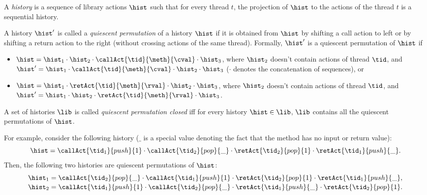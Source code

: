 A \emph{history} is a sequence of library actions $\hist$ such that %
for every thread $t$, the projection of $\hist$ to the actions of the thread $t$ is a sequential history.

A history $\hist'$ is called a \emph{quiescent permutation} of a history $\hist$ if it is obtained from $\hist$ by shifting a call action to left or by shifting a return action to the right (without crossing actions of the same thread).
Formally, $\hist'$ is a quiescent permutation of $\hist$ if 
\begin{itemize}
	\item %
	$\hist=\hist_1\cdot \hist_2\cdot \callAct{\tid}{\meth}{\cval}\cdot \hist_3$, where $\hist_2$ doesn't contain actions of thread $\tid$, and $\hist'=\hist_1\cdot \callAct{\tid}{\meth}{\cval}\cdot \hist_2\cdot  \hist_3$ ($\cdot$ denotes the concatenation of sequences), or
	\item %
	$\hist=\hist_1\cdot \retAct{\tid}{\meth}{\rval}\cdot\hist_2\cdot \hist_3$, where $\hist_2$ doesn't contain actions of thread $\tid$, and $\hist'=\hist_1\cdot \hist_2\cdot \retAct{\tid}{\meth}{\rval}\cdot \hist_3$.
\end{itemize}
A set of histories $\lib$ is called \emph{quiescent permutation closed} iff for every history $\hist\in \lib$, $\lib$ contains all the quiescent permutations of $\hist$.

For example, consider the following history ($\_$ is a special value denoting the fact that the method has no input or return value):
{\small
\[
\hist=\callAct{\tid_1}{push}{1}\cdot \callAct{\tid_2}{pop}{\_}\cdot \retAct{\tid_2}{pop}{1}\cdot \retAct{\tid_1}{push}{\_}.
\]}
Then, the following two histories are quiescent permutations of $\hist$:
{\small
\[
\begin{array}{l}
\hist_1=\callAct{\tid_2}{pop}{\_}\cdot \callAct{\tid_1}{push}{1}\cdot \retAct{\tid_2}{pop}{1}\cdot \retAct{\tid_1}{push}{\_},\\[.5mm]
\hist_2=\callAct{\tid_1}{push}{1}\cdot \callAct{\tid_2}{pop}{\_}\cdot \retAct{\tid_1}{push}{\_} \cdot \retAct{\tid_2}{pop}{1}.
\end{array}
\]}

